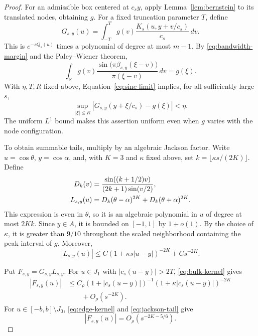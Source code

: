 \documentclass[11pt]{article}
\theoremstyle{definition}
\numberwithin{equation}{section}
\newcommand{\R}{\mathbb R}
\begin{document}
\begin{proof}
For an admissible box centered at \(c_sy\), apply
Lemma~\ref{lem:bernstein} to its translated nodes, obtaining \(g\).
For a fixed truncation parameter \(T\), define
\begin{equation}\label{eq:kernel-projection}
 G_{s,y}(u)=\int_{-T}^{T}
 g(v)\frac{K_s(u,y+v/c_s)}{c_s}\,dv.
\end{equation}
This is \(e^{-sQ_s(u)}\) times a polynomial of degree at most \(m-1\).
By \eqref{eq:bandwidth-margin} and the Paley--Wiener theorem,
\[
 \int_{\R}g(v)
 \frac{\sin\bigl(\pi\beta_{s,y}(\xi-v)\bigr)}{\pi(\xi-v)}\,dv=g(\xi).
\]
With \(\eta,T,R\) fixed above, Equation~\eqref{eq:sine-limit}
implies, for all sufficiently large \(s\),
\begin{equation}\label{eq:projection-approximation}
 \sup_{|\xi|\le R}|G_{s,y}(y+\xi/c_s)-g(\xi)|<\eta.
\end{equation}
The uniform \(L^1\) bound makes this assertion uniform even when
\(g\) varies with the node configuration.

To obtain summable tails, multiply by an algebraic Jackson factor.
Write \(u=\cos\theta\), \(y=\cos\alpha\), and, with \(K=3\) and
\(\kappa\) fixed above, set \(k=\lfloor\kappa s/(2K)\rfloor\).
Define
\begin{align}
 D_k(v)&=\frac{\sin((k+1/2)v)}{(2k+1)\sin(v/2)},\notag\\
 L_{s,y}(u)&=D_k(\theta-\alpha)^{2K}
             +D_k(\theta+\alpha)^{2K}. \label{eq:jackson}
\end{align}
This expression is even in \(\theta\), so it is an algebraic
polynomial in \(u\) of degree at most \(2Kk\).
Since \(y\in A\), it is bounded on \([-1,1]\) by \(1+o(1)\).
By the choice of \(\kappa\), it is greater than \(9/10\) throughout
the scaled neighborhood containing the peak interval of \(g\).
Moreover,
\begin{equation}\label{eq:jackson-tail}
 |L_{s,y}(u)|\le
 C(1+\kappa s|u-y|)^{-2K}+Cs^{-2K}.
\end{equation}

Put \(F_{s,y}=G_{s,y}L_{s,y}\).
For \(u\in J_1\) with \(|c_s(u-y)|>2T\),
\eqref{eq:bulk-kernel} gives
\begin{equation}\label{eq:weighted-tail}
 \begin{split}
 |F_{s,y}(u)|
 &\le C_\rho(1+|c_s(u-y)|)^{-1}
       (1+\kappa|c_s(u-y)|)^{-2K}\\
 &\hspace{2em}+O_\rho(s^{-2K}).
 \end{split}
\end{equation}
For \(u\in[-b,b]\setminus J_0\),
\eqref{eq:edge-kernel} and \eqref{eq:jackson-tail} give
\begin{equation}\label{eq:weighted-edge}
 |F_{s,y}(u)|=O_\rho(s^{-2K-5/6}).
\end{equation}


\end{proof}
\end{document}
